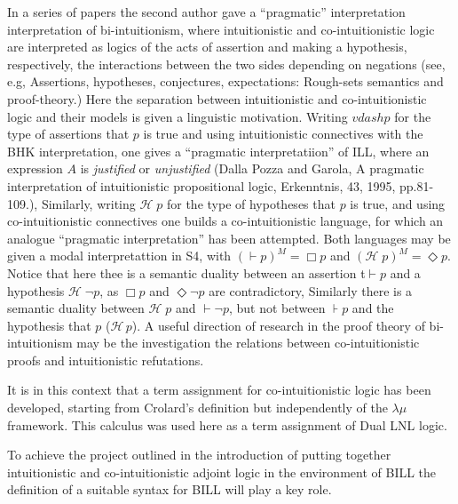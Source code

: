 In a series of papers the second author gave a ``pragmatic''
interpretation interpretation of bi-intuitionism, where intuitionistic
and co-intuitionistic logic are interpreted as logics of the acts of
assertion and making a hypothesis, respectively, the interactions
between the two sides depending on negations (see, e.g,
\cite{Bellin:2014} Assertions, hypotheses, conjectures, expectations:
Rough-sets semantics and proof-theory.)  Here the separation between 
intuitionistic and co-intuitionistic logic and their models is given a 
linguistic motivation. Writing  $vdash p$ for the type of assertions that $p$ 
is true and using intuitionistic connectives with the BHK interpretation, one gives 
a ``pragmatic interpretatiion'' of ILL, where an expression $A$ is \emph{justified} 
or \emph{unjustified} (Dalla Pozza and Garola,  
A pragmatic interpretation of intuitionistic propositional logic, Erkenntnis, 43, 1995, pp.81-109.), 
Similarly, writing $\mathcal{H}\;  p$ for the type of hypotheses that $p$ is true,  and  
using co-intuitionistic connectives one builds a co-intuitionistic language, for which 
an analogue ``pragmatic interpretation'' has been attempted.  Both languages may 
be given a modal interpretattion in S4, with $(\vdash p)^M = \Box p$
and  $(\mathcal{H}\;  p)^M = \Diamond p$. Notice that  here thee is a semantic duality between
an assertion t$\vdash p$  and a hypothesis $\mathcal{H}\; \neg p$, as $\Box p$ and 
$\Diamond \neg p$ are contradictory, Similarly there is a semantic duality between 
$\mathcal{H}\;  p$ and $\vdash \neg p$, but not between $\assert p$ 
and the hypothesis that $p$ ($\mathcal{H}\, p$). A useful direction of research in the 
proof theory of bi-intuitionism may be the investigation the relations between co-intuitionistic
proofs and intuitionistic refutations. 

It is in this context that a term assignment for co-intuitionistic  logic 
has been developed, starting from Crolard's definition but independently
of the $\lambda\mu$ framework. This calculus was used
here as a term assignment of Dual LNL logic.


To achieve the project outlined in the introduction of putting
together intuitionistic and co-intuitionistic adjoint logic in the
environment of BILL the definition of a suitable syntax for BILL will
play a key role.



